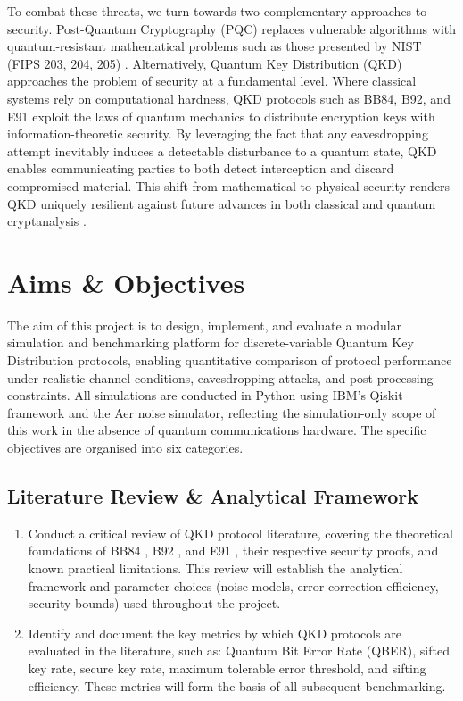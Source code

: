 \documentclass[10pt, a4paper]{report}
\begin{document}
To combat these threats, we turn towards two complementary approaches to security. Post-Quantum Cryptography (PQC) replaces vulnerable algorithms with quantum-resistant mathematical problems such as those presented by NIST (FIPS 203, 204, 205) \cite{NIST}. Alternatively, Quantum Key Distribution (QKD) approaches the problem of security at a fundamental level. Where classical systems rely on computational hardness, QKD protocols such as BB84, B92, and E91 exploit the laws of quantum mechanics to distribute encryption keys with information-theoretic security. By leveraging the fact that any eavesdropping attempt inevitably induces a detectable disturbance to a quantum state, QKD enables communicating parties to both detect interception and discard compromised material. This shift from mathematical to physical security renders QKD uniquely resilient against future advances in both classical and quantum cryptanalysis \cite{BB84, B92, E91}.


\newpage
\section{Aims \& Objectives}

The aim of this project is to design, implement, and evaluate a modular simulation and benchmarking platform for discrete-variable Quantum Key Distribution protocols, enabling quantitative comparison of protocol performance under realistic channel conditions, eavesdropping attacks, and post-processing constraints. All simulations are conducted in Python using IBM's Qiskit framework and the Aer noise simulator, reflecting the simulation-only scope of this work in the absence of quantum communications hardware. The specific objectives are organised into six categories.

\subsection{Literature Review \& Analytical Framework}

\begin{enumerate}[label=\textbf{O1.\arabic*}, leftmargin=1.5cm]
    \item Conduct a critical review of QKD protocol literature, covering the theoretical foundations of BB84 \cite{BB84}, B92 \cite{B92}, and E91 \cite{E91}, their respective security proofs, and known practical limitations. This review will establish the analytical framework and parameter choices (noise models, error correction efficiency, security bounds) used throughout the project.

    \item Identify and document the key metrics by which QKD protocols are evaluated in the literature, such as: Quantum Bit Error Rate (QBER), sifted key rate, secure key rate, maximum tolerable error threshold, and sifting efficiency. These metrics will form the basis of all subsequent benchmarking.
\end{enumerate}
\end{document}
